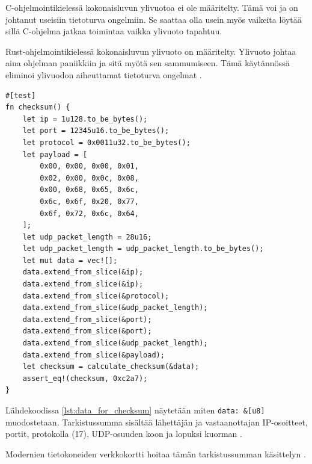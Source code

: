 \documentclass[a4paper,12pt]{article}
\begin{document}
\begin{framed}
    C-ohjelmointikielessä kokonaisluvun ylivuotoa ei ole määritelty. Tämä voi ja on johtanut useisiin tietoturva ongelmiin. Se saattaa olla usein myös vaikeita löytää sillä C-ohjelma jatkaa toimintaa vaikka ylivuoto tapahtuu.\par
    Rust-ohjelmointikielessä kokonaisluvun ylivuoto on määritelty. Ylivuoto johtaa aina ohjelman paniikkiin ja sitä myötä sen sammumiseen. Tämä käytännössä eliminoi ylivuodon aiheuttamat tietoturva ongelmat \cite[ch.~3.2]{rust-book}.
\end{framed}

\begin{minipage}{\linewidth}

\begin{lstlisting}[caption={Tietojen kasaaminen tarkistussummaa varten}, label={lst:data_for_checksum}]
#[test]
fn checksum() {
    let ip = 1u128.to_be_bytes();
    let port = 12345u16.to_be_bytes();
    let protocol = 0x0011u32.to_be_bytes();
    let payload = [
        0x00, 0x00, 0x00, 0x01, 
        0x02, 0x00, 0x0c, 0x08, 
        0x00, 0x68, 0x65, 0x6c, 
        0x6c, 0x6f, 0x20, 0x77, 
        0x6f, 0x72, 0x6c, 0x64,
    ];
    let udp_packet_length = 28u16;
    let udp_packet_length = udp_packet_length.to_be_bytes();
    let mut data = vec![];
    data.extend_from_slice(&ip);
    data.extend_from_slice(&ip);
    data.extend_from_slice(&protocol);
    data.extend_from_slice(&udp_packet_length);
    data.extend_from_slice(&port);
    data.extend_from_slice(&port);
    data.extend_from_slice(&udp_packet_length);
    data.extend_from_slice(&payload);
    let checksum = calculate_checksum(&data);
    assert_eq!(checksum, 0xc2a7);
}
\end{lstlisting}
\end{minipage}

Lähdekoodissa \ref{lst:data_for_checksum} näytetään miten \lstinline{data: &[u8]} muodostetaan. Tarkistussumma sisältää lähettäjän ja vastaanottajan IP-osoitteet, portit, protokolla (17), UDP-osuuden koon ja lopuksi kuorman \cite{RFC-768, protocol-numbers}. \par
    
    Modernien tietokoneiden verkkokortti hoitaa tämän tarkistussumman käsittelyn \cite{TCP/IPLearn}. 
\end{document}
